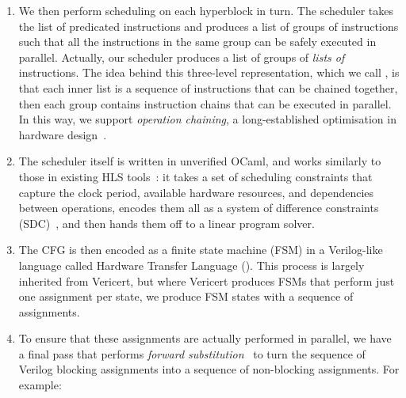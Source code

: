 \begin{enumerate}[label=\protect\blacknum{\arabic*}]
%
%
%
\item We then perform scheduling on each hyperblock in turn. The scheduler takes
  the list of predicated instructions and produces a list of groups of
  instructions such that all the instructions in the same group can be safely
  executed in parallel. Actually, our scheduler produces a list of groups of
  \emph{lists of} instructions. The idea behind this three-level representation,
  which we call \rtlpar, is that each inner list is a sequence of instructions
  that can be chained together, then each group contains instruction chains that
  can be executed in parallel. In this way, we support \emph{operation
    chaining}, a long-established optimisation in hardware
  design~\cite[p.~1101]{pangrle87_desig_tools_intel_silic_compil}.
\item The scheduler itself is written in unverified OCaml, and works similarly
  to those in existing HLS tools~\cite[]{canis13_l}: it takes a set of
  scheduling constraints that capture the clock period, available hardware
  resources, and dependencies between operations, encodes them all as a system
  of difference constraints (SDC)~\cite[]{cong06_sdc}, and then hands them off
  to a linear program solver.

\item The CFG is then encoded as a finite state machine (FSM) in a Verilog-like
  language called Hardware Transfer Language (\htl). This process is largely
  inherited from Vericert, but where Vericert produces FSMs that perform just
  one assignment per state, we produce FSM states with a sequence of
  assignments.

\item To ensure that these assignments are actually performed in parallel, we
  have a final pass that performs \emph{forward
    substitution}~\cite[p.~109]{hopwood78_decom} to turn the sequence of Verilog
  blocking assignments into a sequence of non-blocking assignments. For example:
\begin{center}
\end{center}


\end{enumerate}
